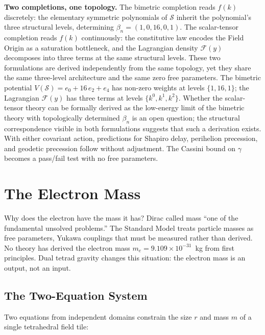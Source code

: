 \documentclass[aps,prd,preprint,superscriptaddress,showpacs,preprintnumbers,amsmath,amssymb,nofootinbib]{revtex4-2}
\begin{document}
\textbf{Two completions, one topology.} The bimetric completion reads $f(k)$ discretely: the elementary symmetric polynomials of $\mathcal{S}$ inherit the polynomial's three structural levels, determining $\beta_n = (1, 0, 16, 0, 1)$. The scalar-tensor completion reads $f(k)$ continuously: the constitutive law encodes the Field Origin as a saturation bottleneck, and the Lagrangian density $\mathcal{F}(y)$ decomposes into three terms at the same structural levels. These two formulations are derived independently from the same topology, yet they share the same three-level architecture and the same zero free parameters. The bimetric potential $V(\mathcal{S}) = e_0 + 16\,e_2 + e_4$ has non-zero weights at levels $\{1, 16, 1\}$; the Lagrangian $\mathcal{F}(y)$ has three terms at levels $\{k^0, k^1, k^2\}$. Whether the scalar-tensor theory can be formally derived as the low-energy limit of the bimetric theory with topologically determined $\beta_n$ is an open question; the structural correspondence visible in both formulations suggests that such a derivation exists. With either covariant action, predictions for Shapiro delay, perihelion precession, and geodetic precession follow without adjustment. The Cassini bound on $\gamma$ becomes a pass/fail test with no free parameters.

\section{The Electron Mass}
\label{sec:electron-mass}

Why does the electron have the mass it has? Dirac called mass ``one of the fundamental unsolved problems.'' The Standard Model treats particle masses as free parameters, Yukawa couplings that must be measured rather than derived. No theory has derived the electron mass $m_e = 9.109 \times 10^{-31}$~kg from first principles. Dual tetrad gravity changes this situation: the electron mass is an output, not an input.

\subsection{The Two-Equation System}
\label{subsec:two-eq}

Two equations from independent domains constrain the size $r$ and mass $m$ of a single tetrahedral field tile:
\end{document}
